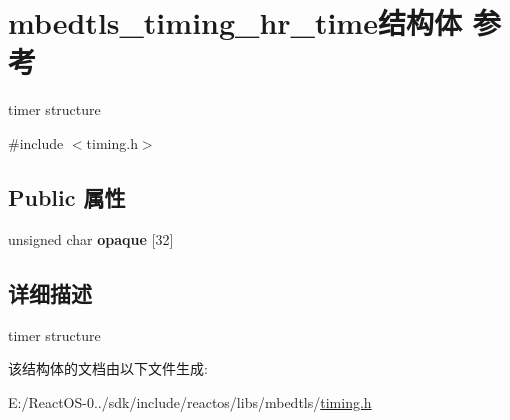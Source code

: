 \hypertarget{structmbedtls__timing__hr__time}{}\section{mbedtls\+\_\+timing\+\_\+hr\+\_\+time结构体 参考}
\label{structmbedtls__timing__hr__time}


timer structure  




{\ttfamily \#include $<$timing.\+h$>$}

\subsection*{Public 属性}
\begin{DoxyCompactItemize}
\item 
\mbox{\label{structmbedtls__timing__hr__time_a5ad2da97c4ec844c558bb9a49d62ba2f}} 
unsigned char {\bfseries opaque} \mbox{[}32\mbox{]}
\end{DoxyCompactItemize}


\subsection{详细描述}
timer structure 

该结构体的文档由以下文件生成\+:\begin{DoxyCompactItemize}
\item 
E\+:/\+React\+O\+S-\/0../sdk/include/reactos/libs/mbedtls/\hyperlink{timing_8h}{timing.\+h}\end{DoxyCompactItemize}

